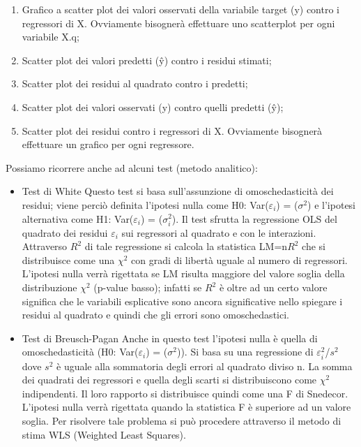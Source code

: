 \documentclass[a4page, 11pt]{article}
\begin{document}
\begin{enumerate}[noitemsep]
\item Grafico a scatter plot dei valori osservati della variabile target (y) contro i regressori di X. Ovviamente bisognerà effettuare uno scatterplot per ogni variabile X.q;
\item Scatter plot dei valori predetti (ŷ) contro i residui stimati;
\item Scatter plot dei residui al quadrato contro i predetti;
\item Scatter plot dei valori osservati (y) contro quelli predetti (ŷ);
\item Scatter plot dei residui contro i regressori di X. Ovviamente bisognerà effettuare un grafico per ogni regressore.
\end{enumerate}
Possiamo ricorrere anche ad alcuni test (metodo analitico):
\begin{itemize}
\item Test di White
Questo test si basa sull’assunzione di omoschedasticità dei residui; viene perciò definita l’ipotesi nulla come H0: Var($\varepsilon_i$) = ($\sigma^2$) e l’ipotesi alternativa come H1: Var($\varepsilon_i$) = ($\sigma^2_i$).
Il test sfrutta la regressione OLS del quadrato dei residui $\varepsilon_i$ sui regressori al quadrato e con le interazioni.
Attraverso $R^{2}$ di tale regressione si calcola la statistica LM=n$R^{2}$ che si distribuisce come una $\chi^{2}$ con gradi di libertà uguale al numero di regressori. L’ipotesi nulla verrà rigettata se LM risulta maggiore del valore soglia della distribuzione $\chi^{2}$ (p-value basso); infatti se $R^{2}$ è oltre ad un certo valore significa che le variabili esplicative sono ancora significative nello spiegare i residui al quadrato e quindi che gli errori sono omoschedastici.
\item Test di Breusch-Pagan
Anche in questo test l’ipotesi nulla è quella di omoschedasticità (H0: Var($\varepsilon_i$) = ($\sigma^2$)).
Si basa su una regressione di $\varepsilon^{2}_i$/$s^{2}$ dove $s^{2}$ è uguale alla sommatoria degli errori al quadrato diviso n. La somma dei quadrati dei regressori e quella degli scarti si distribuiscono come $\chi^{2}$ indipendenti. Il loro rapporto si distribuisce quindi come una F di Snedecor. L’ipotesi nulla verrà rigettata quando la statistica F è superiore ad un valore soglia.
\newline
Per risolvere tale problema si può procedere attraverso il metodo di stima WLS (Weighted Least Squares).
\end{itemize}
\end{document}
